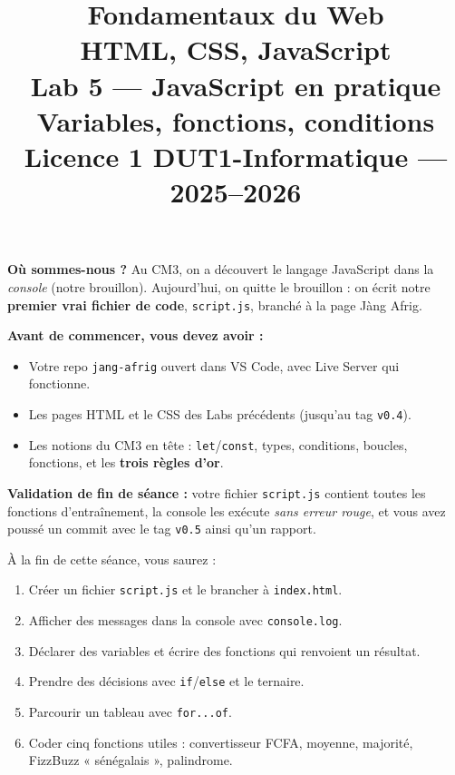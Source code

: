 \documentclass[11pt,a4paper]{article}
\title{%
\vspace{-1cm}
\textbf{\LARGE Fondamentaux du Web}\\
\textbf{\LARGE HTML, CSS, JavaScript}\\[0.8cm]
\textbf{\huge Lab 5 --- JavaScript en pratique}\\[0.3cm]
\textbf{\Large Variables, fonctions, conditions}\\[0.5cm]
\large Licence 1 DUT1-Informatique --- 2025--2026}
\date{}
\author{}
\newcommand{\code}[1]{\texttt{#1}}
\begin{document}
\maketitle
\thispagestyle{empty}

\begin{prereqbox}
\textbf{Où sommes-nous ?} Au CM3, on a découvert le langage JavaScript dans la \emph{console} (notre brouillon). Aujourd'hui, on quitte le brouillon : on écrit notre \textbf{premier vrai fichier de code}, \code{script.js}, branché à la page Jàng Afrig.

\smallskip
\textbf{Avant de commencer, vous devez avoir :}
\begin{itemize}[leftmargin=*,noitemsep]
  \item Votre repo \code{jang-afrig} ouvert dans VS Code, avec Live Server qui fonctionne.
  \item Les pages HTML et le CSS des Labs précédents (jusqu'au tag \code{v0.4}).
  \item Les notions du CM3 en tête : \code{let}/\code{const}, types, conditions, boucles, fonctions, et les \textbf{trois règles d'or}.
\end{itemize}

\smallskip
\textbf{Validation de fin de séance :} votre fichier \code{script.js} contient toutes les fonctions d'entraînement, la console les exécute \emph{sans erreur rouge}, et vous avez poussé un commit avec le tag \code{v0.5} ainsi qu'un rapport.
\end{prereqbox}

\begin{objectifbox}
À la fin de cette séance, vous saurez :
\begin{enumerate}[leftmargin=*,noitemsep]
  \item Créer un fichier \code{script.js} et le brancher à \code{index.html}.
  \item Afficher des messages dans la console avec \code{console.log}.
  \item Déclarer des variables et écrire des fonctions qui renvoient un résultat.
  \item Prendre des décisions avec \code{if}/\code{else} et le ternaire.
  \item Parcourir un tableau avec \code{for...of}.
  \item Coder cinq fonctions utiles : convertisseur FCFA, moyenne, majorité, FizzBuzz « sénégalais », palindrome.
\end{enumerate}
\end{objectifbox}
\end{document}
